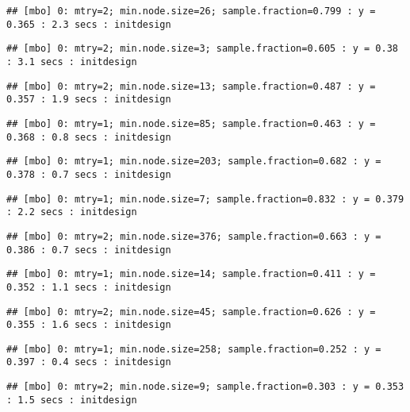 \documentclass[
]{article}
\begin{document}
\begin{verbatim}
## [mbo] 0: mtry=2; min.node.size=26; sample.fraction=0.799 : y = 0.365 : 2.3 secs : initdesign
\end{verbatim}

\begin{verbatim}
## [mbo] 0: mtry=2; min.node.size=3; sample.fraction=0.605 : y = 0.38 : 3.1 secs : initdesign
\end{verbatim}

\begin{verbatim}
## [mbo] 0: mtry=2; min.node.size=13; sample.fraction=0.487 : y = 0.357 : 1.9 secs : initdesign
\end{verbatim}

\begin{verbatim}
## [mbo] 0: mtry=1; min.node.size=85; sample.fraction=0.463 : y = 0.368 : 0.8 secs : initdesign
\end{verbatim}

\begin{verbatim}
## [mbo] 0: mtry=1; min.node.size=203; sample.fraction=0.682 : y = 0.378 : 0.7 secs : initdesign
\end{verbatim}

\begin{verbatim}
## [mbo] 0: mtry=1; min.node.size=7; sample.fraction=0.832 : y = 0.379 : 2.2 secs : initdesign
\end{verbatim}

\begin{verbatim}
## [mbo] 0: mtry=2; min.node.size=376; sample.fraction=0.663 : y = 0.386 : 0.7 secs : initdesign
\end{verbatim}

\begin{verbatim}
## [mbo] 0: mtry=1; min.node.size=14; sample.fraction=0.411 : y = 0.352 : 1.1 secs : initdesign
\end{verbatim}

\begin{verbatim}
## [mbo] 0: mtry=2; min.node.size=45; sample.fraction=0.626 : y = 0.355 : 1.6 secs : initdesign
\end{verbatim}

\begin{verbatim}
## [mbo] 0: mtry=1; min.node.size=258; sample.fraction=0.252 : y = 0.397 : 0.4 secs : initdesign
\end{verbatim}

\begin{verbatim}
## [mbo] 0: mtry=2; min.node.size=9; sample.fraction=0.303 : y = 0.353 : 1.5 secs : initdesign
\end{verbatim}
\end{document}
